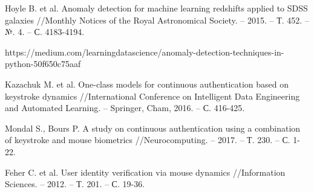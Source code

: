 \documentclass[12pt]{article}
\begin{document}
\begin{thebibliography}{20}
        Hoyle B. et al. Anomaly detection for machine learning redshifts applied to SDSS galaxies //Monthly Notices of the Royal Astronomical Society. – 2015. – Т. 452. – №. 4. – С. 4183-4194.

        https://medium.com/learningdatascience/anomaly-detection-techniques-in-python-50f650c75aaf

        Kazachuk M. et al. One-class models for continuous authentication based on keystroke dynamics //International Conference on Intelligent Data Engineering and Automated Learning. – Springer, Cham, 2016. – С. 416-425.

        Mondal S., Bours P. A study on continuous authentication using a combination of keystroke and mouse biometrics //Neurocomputing. – 2017. – Т. 230. – С. 1-22.

        Feher C. et al. User identity verification via mouse dynamics //Information Sciences. – 2012. – Т. 201. – С. 19-36.
        
    \end{thebibliography}
\end{document}
